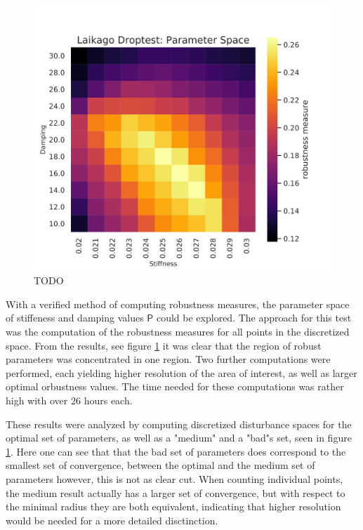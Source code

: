 \begin{figure}[h]
\begin{minipage}{0.33\textwidth}
        \end{minipage}
        \begin{minipage}{0.33\textwidth}
            \centering
            \includegraphics[width=\textwidth]{figures/droptest_ps_zoom2_v2.png} %
        \end{minipage}

    \caption{TODO}
    \label{fig:dropps}
    \end{figure}

    With a verified method of computing robustness measures, the parameter space of stiffeness and damping values $\mathsf{P}$ could be explored. The approach for this test was the computation of the robustness measures for all points in the  discretized space. From the results, see figure \ref{fig:dropps} it was clear that the region of robust parameters was concentrated in one region. Two further computations were performed, each yielding higher resolution of the area of interest, as well as larger optimal orbustness values. The time needed for these computations was rather high with over 26 hours each. 

    These results were analyzed by computing discretized disturbance spaces for the optimal set of parameters, as well as a "medium" and a "bad"s set, seen in figure \ref{fig:dropps}. Here one can see that that the bad set of parameters does correspond to the smallest set of convergence, between the optimal and the medium set of parameters however, this is not as clear cut. When counting individual points, the medium result actually has a larger set of convergence, but with respect to the minimal radius they are both equivalent, indicating that higher resolution would be needed for a more detailed disctinction. 

